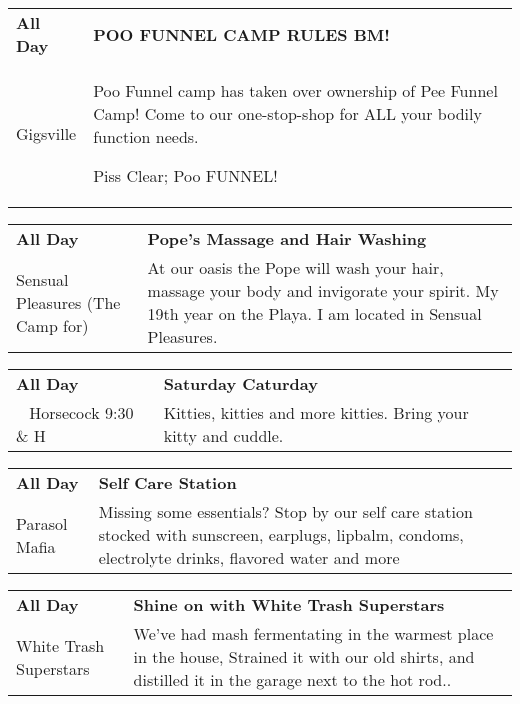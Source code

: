 \begin{tabular}{ p{1in} p{2.2in} }
    \textbf{All Day} & \textbf{POO FUNNEL CAMP RULES BM!} \\
    Gigsville \newline  & Poo Funnel camp has taken over ownership of Pee Funnel Camp! Come to our one-stop-shop for ALL your bodily function needs.

Piss Clear;
Poo FUNNEL! \\
    \hline 
\end{tabular}
    
\begin{tabular}{ p{1in} p{2.2in} }
    \textbf{All Day} & \textbf{Pope's Massage and Hair Washing} \\
    Sensual Pleasures (The Camp for) \newline  & At our oasis the Pope will wash your hair, massage your body and invigorate your spirit. My 19th year on the Playa. I am located in Sensual Pleasures. \\
    \hline 
\end{tabular}
    
\begin{tabular}{ p{1in} p{2.2in} }
    \textbf{All Day} & \textbf{Saturday Caturday} \\
    ~ \newline Horsecock 9:30 \& H & Kitties, kitties and more kitties.  Bring your kitty and cuddle. \\
    \hline 
\end{tabular}
    
\begin{tabular}{ p{1in} p{2.2in} }
    \textbf{All Day} & \textbf{Self Care Station} \\
    Parasol Mafia \newline  & Missing some essentials? Stop by our self care station stocked with sunscreen, earplugs, lipbalm, condoms, electrolyte drinks, flavored water and more \\
    \hline 
\end{tabular}
    
\begin{tabular}{ p{1in} p{2.2in} }
    \textbf{All Day} & \textbf{Shine on with White Trash Superstars} \\
    White Trash Superstars \newline  & We've had mash fermentating in the warmest place in the house, Strained it with our old shirts, and distilled it in the garage next to the hot rod.. \\
    \hline 
\end{tabular}
    
